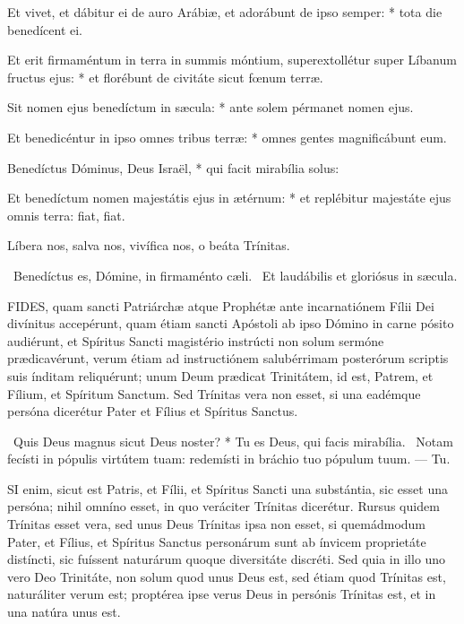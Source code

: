 Et vivet, et dábitur ei de auro Arábiæ, et adorábunt de ipso semper: * tota die benedícent ei.

Et erit firmaméntum in terra in summis móntium, superextollétur super Líbanum fructus ejus: * et florébunt de civitáte sicut fœnum terræ.

Sit nomen ejus benedíctum in sæcula: * ante solem pérmanet nomen ejus.

Et benedicéntur in ipso omnes tribus terræ: * omnes gentes magnificábunt eum.

Benedíctus Dóminus, Deus Israël, * qui facit mirabília solus:

Et benedíctum nomen majestátis ejus in ætérnum: * et replébitur majestáte ejus omnis terra: fiat, fiat.

 Líbera nos, salva nos, vivífica nos, o beáta Trínitas.

\V\ Benedíctus es, Dómine, in firmaménto cæli. \R\ Et laudábilis et gloriósus in sæcula.




\lettrine[lines=2]{F}{IDES}, quam sancti Patriárchæ atque Prophétæ ante incarnatiónem Fílii Dei divínitus accepérunt, quam étiam sancti Apóstoli ab ipso Dómino in carne pósito audiérunt, et Spíritus Sancti magistério instrúcti non solum sermóne prædicavérunt, verum étiam ad instructiónem salubérrimam posterórum scriptis suis índitam reliquérunt; unum Deum prædicat Trinitátem, id est, Patrem, et Fílium, et Spíritum Sanctum. Sed Trínitas vera non esset, si una eadémque persóna dicerétur Pater et Fílius et Spíritus Sanctus.

\R\ Quis Deus magnus sicut Deus noster? * Tu es Deus, qui facis mirabília. \V\ Notam fecísti in pópulis virtútem tuam: redemísti in bráchio tuo pópulum tuum. --- Tu.


\lettrine[lines=2]{S}{I} enim, sicut est Patris, et Fílii, et Spíritus Sancti una substántia, sic esset una persóna; nihil omníno esset, in quo veráciter Trínitas dicerétur. Rursus quidem Trínitas esset vera, sed unus Deus Trínitas ipsa non esset, si quemádmodum Pater, et Fílius, et Spíritus Sanctus personárum sunt ab ínvicem proprietáte distíncti, sic fuíssent naturárum quoque diversitáte discréti. Sed quia in illo uno vero Deo Trinitáte, non solum quod unus Deus est, sed étiam quod Trínitas est, naturáliter verum est; proptérea ipse verus Deus in persónis Trínitas est, et in una natúra unus est.

